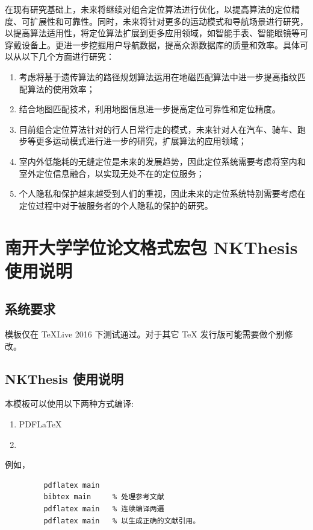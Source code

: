 在现有研究基础上，未来将继续对组合定位算法进行优化，以提高算法的定位精度、可扩展性和可靠性。同时，未来将针对更多的运动模式和导航场景进行研究，以提高算法适用性，将定位算法扩展到更多应用领域，如智能手表、智能眼镜等可穿戴设备上。更进一步挖掘用户导航数据，提高众源数据库的质量和效率。具体可以从以下几个方面进行研究：

\begin{enumerate}[1{）}]
	\item 考虑将基于遗传算法的路径规划算法运用在地磁匹配算法中进一步提高指纹匹配算法的使用效率；
	\item 结合地图匹配技术，利用地图信息进一步提高定位可靠性和定位精度。
	\item 目前组合定位算法针对的行人日常行走的模式，未来针对人在汽车、骑车、跑步等更多运动模式进行进一步的研究，扩展算法的应用领域；
	\item 室内外低能耗的无缝定位是未来的发展趋势，因此定位系统需要考虑将室内和室外定位信息融合，以实现无处不在的定位服务；
	\item 个人隐私和保护越来越受到人们的重视，因此未来的定位系统特别需要考虑在定位过程中对于被服务者的个人隐私的保护的研究。
\end{enumerate}



\chapter{南开大学学位论文格式宏包 NKThesis 使用说明} \label{chpt:A}

\section{系统要求}

模板仅在 TeXLive 2016 下测试通过。对于其它 TeX 发行版可能需要做个别修改。


\section{NKThesis 使用说明}

本模板可以使用以下两种方式编译:
\begin{enumerate}
 \item PDF\LaTeX

 \item \XeLaTeX [推荐]
\end{enumerate}

例如，
\begin{verbatim}
         pdflatex main
         bibtex main     % 处理参考文献
         pdflatex main   % 连续编译两遍
         pdflatex main   % 以生成正确的文献引用。
\end{verbatim}

